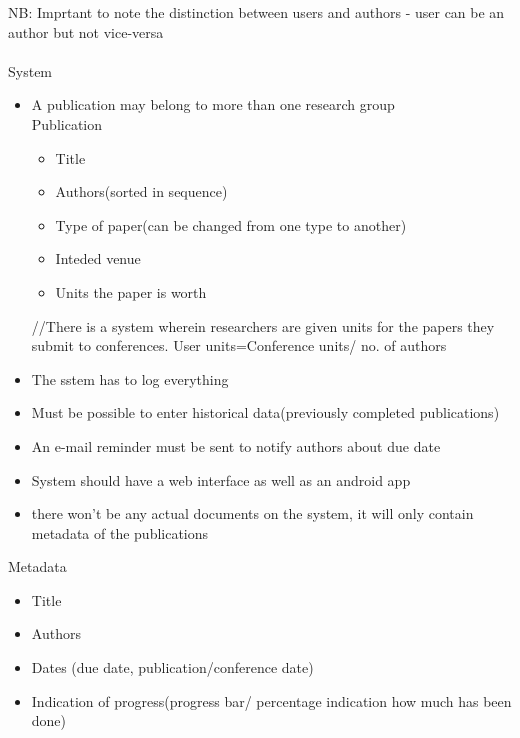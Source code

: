 \documentclass{article}
\begin{document}
	\large NB: Imprtant to note the distinction between users and authors - user can be an author but not vice-versa \normalsize \\ \\
	System
	\begin{itemize}
		\item A publication may belong to more than one research group\\
			Publication
			\begin{itemize}
				\item Title
				\item Authors(sorted in sequence)
				\item Type of paper(can be changed from one type to another)
				\item Inteded venue
				\item Units the paper is worth
			\end{itemize}
		//There is a system wherein researchers are given units for the papers they submit to conferences. User units=Conference units/ no. of authors
		\item The sstem has to log everything
		\item Must be possible to enter historical data(previously completed publications)
		\item An e-mail reminder must be sent to notify authors about due date
		\item System should have a web interface as well as an android app
		\item there won't be any actual documents on the system, it will only contain metadata of the publications
	\end{itemize}

	Metadata
	\begin{itemize}
		\item Title
		\item Authors
		\item Dates (due date, publication/conference date)
		\item Indication of progress(progress bar/ percentage indication how much has been done)
	\end{itemize}
\end{document}
